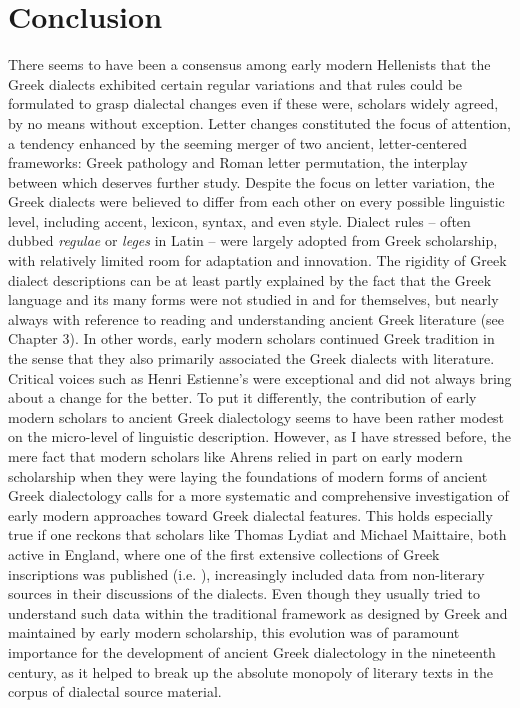 \section{Conclusion}

There seems to have been a consensus among early modern Hellenists that the Greek dialects exhibited certain regular variations and that rules could be formulated to grasp dialectal changes even if these were, scholars widely agreed, by no means without exception. Letter changes constituted the focus of attention, a tendency enhanced by the seeming merger of two ancient, letter-centered frameworks: Greek pathology and Roman letter permutation, the interplay between which deserves further study. Despite the focus on letter variation, the Greek dialects were believed to differ from each other on every possible linguistic level, including accent, lexicon, syntax, and even style. Dialect rules – often dubbed \textit{regulae} or \textit{leges} in Latin – were largely adopted from Greek scholarship, with relatively limited room for adaptation and innovation. The rigidity of Greek dialect descriptions can be at least partly explained by the fact that the Greek language and its many forms were not studied in and for themselves, but nearly always with reference to reading and understanding ancient Greek literature (see Chapter 3). In other words, early modern scholars continued Greek tradition in the sense that they also primarily associated the Greek dialects with literature. Critical voices such as Henri Estienne’s were exceptional and did not always bring about a change for the better. To put it differently, the contribution of early modern scholars to ancient Greek dialectology seems to have been rather modest on the micro-level of linguistic description. However, as I have stressed before, the mere fact that modern scholars like Ahrens relied in part on early modern scholarship when they were laying the foundations of modern forms of ancient Greek dialectology calls for a more systematic and comprehensive investigation of early modern approaches toward Greek dialectal features. This holds especially true if one reckons that scholars like Thomas Lydiat and Michael Maittaire, both active in England, where one of the first extensive collections of Greek inscriptions was published (i.e. \citealt{Prideaux1676}), increasingly included data from non-literary sources in their discussions of the dialects. Even though they usually tried to understand such data within the traditional framework as designed by Greek and maintained by early modern scholarship, this evolution was of paramount importance for the development of ancient Greek dialectology in the nineteenth century, as it helped to break up the absolute monopoly of literary texts in the corpus of dialectal source material.

